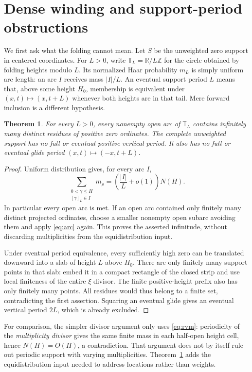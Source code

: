 \documentclass[11pt,a4paper]{article}
\newtheorem{theorem}{Theorem}[section]
\theoremstyle{definition}
\theoremstyle{remark}
\newcommand{\R}{\mathbb R}
\newcommand{\Z}{\mathbb Z}
\newcommand{\T}{\mathbb T}
\begin{document}
\section{Dense winding and support-period obstructions}\label{sec:support}

We first ask what the folding cannot mean. Let $S$ be the unweighted zero
support in centered coordinates. For $L>0$, write $\T_L=\R/L\Z$ for the
circle obtained by folding heights modulo $L$. Its normalized Haar
probability $m_L$ is simply uniform arc length: an arc $I$ receives mass
$|I|/L$. An eventual support period $L$ means that, above some height $H_0$,
membership is equivalent under $(x,t)\mapsto(x,t+L)$ whenever both heights
are in that tail. Mere forward inclusion is a different hypothesis.

\begin{theorem}\label{thm:support}
For every $L>0$, every nonempty open arc of $\T_L$ contains infinitely many
distinct residues of positive zero ordinates. The complete unweighted support
has no full or eventual positive vertical period. It also has no full or
eventual glide period $(x,t)\mapsto(-x,t+L)$.
\end{theorem}
\begin{proof}
Uniform distribution gives, for every arc $I$,
\begin{equation}\label{eq:arc}
 \sum_{\substack{0<\gamma\le H\\{}[\gamma]_L\in I}}m_\rho
   =\left(\frac{|I|}{L}+o(1)\right)N(H).
\end{equation}
In particular every open arc is met. If an open arc contained only finitely
many distinct projected ordinates, choose a smaller nonempty open subarc
avoiding them and apply \eqref{eq:arc} again. This proves the asserted
infinitude, without discarding multiplicities from the equidistribution input.

Under eventual period equivalence, every sufficiently high zero can be
translated downward into a slab of height $L$ above $H_0$. There are only
finitely many support points in that slab: embed it in a compact rectangle
of the closed strip and use local finiteness of the entire $\xi$ divisor.
The finite positive-height prefix also has only finitely many points.
All residues would thus belong to a finite set, contradicting the first
assertion. Squaring an eventual glide gives an eventual vertical period
$2L$, which is already excluded.
\end{proof}

For comparison, the simpler divisor argument only uses \eqref{eq:rvm}:
periodicity of the \emph{multiplicity divisor} gives the same finite mass in
each half-open height cell, hence $N(H)=O(H)$, a contradiction. That argument
does not by itself rule out periodic support with varying multiplicities.
Theorem~\ref{thm:support} adds the equidistribution input needed to address
locations rather than weights.
\end{document}
